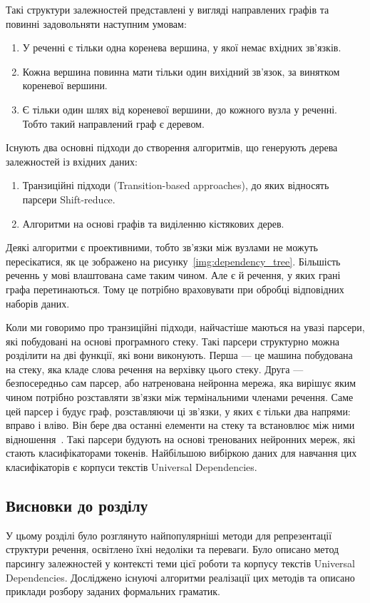 Такі структури залежностей представлені у вигляді направлених графів та
повинні задовольняти наступним умовам:
\begin{enumerate}
    \item У реченні є тільки одна коренева вершина, у якої немає вхідних зв'язків.
    \item Кожна вершина повинна мати тільки один вихідний зв'язок, за
    винятком кореневої вершини.
    \item Є тільки один шлях від кореневої вершини, до кожного
    вузла у реченні. Тобто такий направлений граф є деревом.
\end{enumerate}

Існують два основні підходи до створення алгоритмів, що генерують дерева
залежностей із вхідних даних:
\begin{enumerate}
    \item Транзиційні підходи (Transition-based approaches), до яких відносять парсери
    Shift-reduce.
    \item Алгоритми на основі графів та виділенню кістякових дерев.
\end{enumerate}

Деякі алгоритми є проективними, тобто зв'язки між вузлами не можуть пересікатися, як
це зображено на рисунку~\ref{img:dependency_tree}. Більшість реченнь у мові
влаштована саме таким чином. Але є й речення, у яких грані графа перетинаються. Тому це
потрібно враховувати при обробці відповідних наборів даних.

Коли ми говоримо про транзиційні підходи, найчастіше маються на увазі
парсери, які побудовані на основі програмного стеку. Такі парсери структурно можна
розділити на дві функції, які вони виконують. Перша --- це машина побудована на стеку,
яка кладе слова речення на верхівку цього стеку. Друга --- безпосередньо
сам парсер, або натренована нейронна мережа, яка вирішує яким чином потрібно
розставляти зв'язки між термінальними членами речення. Саме цей парсер і будує
граф, розставляючи ці зв'язки, у яких є тільки два напрями: вправо і вліво.
Він бере два останні елементи на стеку та встановлює між ними відношення~\cite{bib8}.
Такі парсери будують на основі тренованих нейронних мереж, які
стають класифікаторами токенів. Найбільшою вибіркою даних для навчання цих класифікаторів
є корпуси текстів Universal Dependencies.

\subsection*{Висновки до розділу }
У цьому розділі було розглянуто найпопулярніші методи для репрезентації структури
речення, освітлено їхні недоліки та переваги. Було описано метод парсингу
залежностей у контексті теми цієї роботи та корпусу текстів Universal
Dependencies. Досліджено існуючі алгоритми реалізації цих методів та описано
приклади розбору заданих формальних граматик.